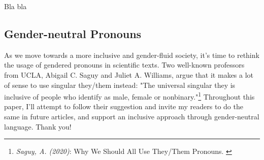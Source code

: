 Bla bla

\subsection{Gender-neutral Pronouns}

As we move towards a more inclusive and gender-fluid society, it's time to rethink the usage of gendered pronouns in scientific texts. Two well-known professors from UCLA, Abigail C. Saguy and Juliet A. Williams, argue that it makes a lot of sense to use singular they/them instead: "The universal singular they is inclusive of people who identify as male, female or nonbinary."\footnote{\textit{Saguy, A. (2020)}: Why We Should All Use They/Them Pronouns. \cite{pronouns}} Throughout this paper, I'll attempt to follow their suggestion and invite my readers to do the same in future articles, and support an inclusive approach through gender-neutral language. Thank you!

